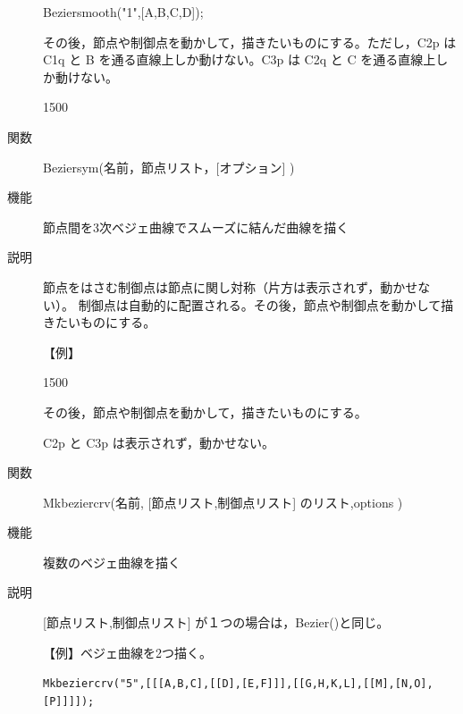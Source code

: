 \documentclass[papersize,a4paper,12pt,uplatex]{jsarticle}
\begin{document}
\begin{description}
Beziersmooth("1",[A,B,C,D]);

\vspace{20mm}
その後，節点や制御点を動かして，描きたいものにする。ただし，C2p は C1q と B を通る直線上しか動けない。C3p は C2q と C を通る直線上しか動けない。

\begin{layer}{150}{0}
\end{layer}

\vspace{40mm}

\vspace{\baselineskip}
\hypertarget{beziersym}{}
\item[関数]  Beziersym(名前，節点リスト，[オプション] )
\item[機能]  節点間を3次ベジェ曲線でスムーズに結んだ曲線を描く
\item[説明]  節点をはさむ制御点は節点に関し対称（片方は表示されず，動かせない）。
制御点は自動的に配置される。その後，節点や制御点を動かして描きたいものにする。

【例】

\begin{layer}{150}{0}
\end{layer}

\vspace{50mm}

その後，節点や制御点を動かして，描きたいものにする。

C2p と C3p は表示されず，動かせない。
\begin{center}  \end{center}

\vspace{\baselineskip}
\hypertarget{mkbeziercrv}{}
\item[関数]  Mkbeziercrv(名前, [節点リスト,制御点リスト] のリスト,options )
\item[機能]  複数のベジェ曲線を描く
\item[説明]  [節点リスト,制御点リスト] が１つの場合は，Bezier()と同じ。

\vspace{\baselineskip}
【例】ベジェ曲線を2つ描く。

\verb|Mkbeziercrv("5",[[[A,B,C],[[D],[E,F]]],[[G,H,K,L],[[M],[N,O],[P]]]]);|

 


\end{description}
\end{document}

